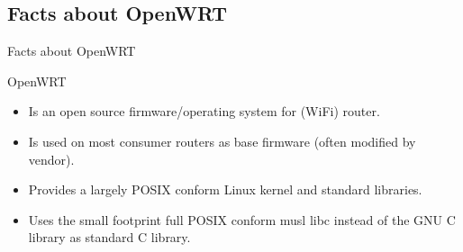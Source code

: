 ﻿\subsection{Facts about OpenWRT}

\begin{frame}{Facts about OpenWRT}
\begin{center}
\LARGE {\color{fh-ooe-red}OpenWRT}
\href{https://openwrt.org/}{}
\end{center}

\begin{itemize}
  \item Is an \alert{open source firmware/operating system} for (WiFi) \alert{router}.
  \item Is used on \alert{most consumer routers} as base firmware (often modified by vendor).
  \item Provides a largely \alert{POSIX} \href{https://en.wikipedia.org/wiki/POSIX}{} conform Linux kernel and standard libraries.
  \item Uses the small footprint full POSIX conform \alert{musl libc} \href{https://musl.libc.org/}{} instead of the \alert{GNU C library} \href{https://www.gnu.org/software/libc/}{} as standard C library.
\end{itemize}
\end{frame}
